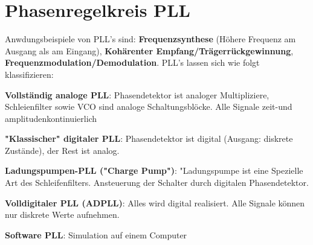 \raggedright
\section {Phasenregelkreis PLL }
Anwdungsbeispiele von PLL's sind: \textbf{Frequenzsynthese} (Höhere Frequenz am Ausgang als am Eingang), \textbf{Kohärenter Empfang/Trägerrückgewinnung}, \textbf{Frequenzmodulation/Demodulation}.  PLL's lassen sich wie folgt klassifizieren:\\
\begin{compactenum}
    \item \textbf{Vollständig analoge PLL}: Phasendetektor ist analoger Multipliziere, Schleienfilter sowie VCO sind analoge Schaltungsblöcke. Alle Signale zeit-und amplitudenkontinuierlich
    \item \textbf{"Klassischer" digitaler PLL}: Phasendetektor ist digital (Ausgang: diskrete Zustände), der Rest ist analog.
    \item \textbf{Ladungspumpen-PLL ("Charge Pump")}: "Ladungspumpe ist eine Spezielle Art des Schleifenfilters. Ansteuerung der Schalter durch  digitalen Phasendetektor.
    \item \textbf{Volldigitaler PLL (ADPLL)}: Alles wird digital realisiert. Alle Signale können nur diskrete Werte aufnehmen.
    \item \textbf{Software PLL}: Simulation auf einem Computer
\end{compactenum}

